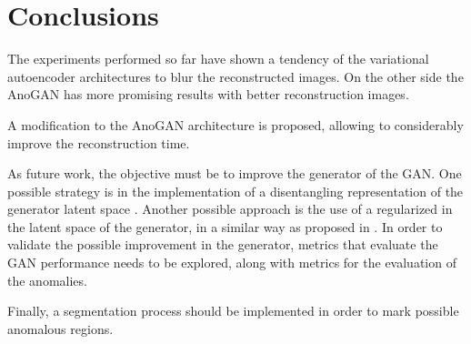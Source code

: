 \chapter{Conclusions}
\label{ch:conclusions}

The experiments performed so far have shown a tendency of the variational autoencoder architectures to blur the reconstructed images. On the other side the AnoGAN has more promising results with better reconstruction images.

A modification to the AnoGAN architecture is proposed, allowing to considerably improve the reconstruction time.

As future work, the objective must be to improve the generator of the GAN. One possible strategy is in the implementation of a disentangling representation of the generator latent space \cite{Higgins2016}. Another possible approach is the use of a regularized in the latent space of the generator, in a similar way as proposed in \cite{Karras2018}. In order to validate the possible improvement in the generator, metrics that evaluate the GAN performance needs to be explored, along with metrics for the evaluation of the anomalies.

Finally, a segmentation process should be implemented in order to mark possible anomalous regions.
